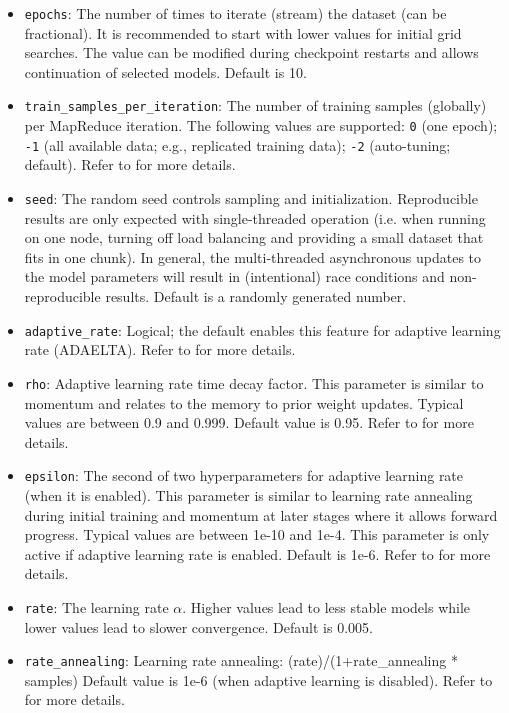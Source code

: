 \documentclass{article}[11pt]
\begin{document}
\begin{itemize}
\item \texttt{epochs}: The number of times to iterate (stream) the dataset (can be fractional). It is recommended to start with lower values for initial grid searches. The value can be modified during checkpoint restarts and allows continuation of selected models. Default is 10.
\item \texttt{train\_samples\_per\_iteration}: The number of training samples (globally) per MapReduce iteration. The following values are supported: \texttt{0} (one epoch); \texttt{-1} (all available data; e.g., replicated training data); \texttt{-2} (auto-tuning; default). Refer to  for more details.
\item \texttt{seed}: The random seed controls sampling and initialization. Reproducible results are only expected with single-threaded operation (i.e. when running on one node, turning off load balancing and providing a small dataset that fits in one chunk).  In general, the multi-threaded asynchronous updates to the model parameters will result in (intentional) race conditions and non-reproducible results.  Default is a randomly generated number.
\item \texttt{adaptive\_rate}: Logical; the default enables this feature for adaptive learning rate (ADAELTA). Refer to   for more details.
\item \texttt{rho}: Adaptive learning rate time decay factor. This parameter is similar to momentum and relates to the memory to prior weight updates. Typical values are between 0.9 and 0.999. Default value is 0.95. Refer to  for more details.
\item \texttt{epsilon}: The second of two hyperparameters for adaptive learning rate (when it is enabled). This parameter is similar to learning rate annealing during initial training and momentum at later stages where it allows forward progress. Typical values are between 1e-10 and 1e-4. This parameter is only active if adaptive learning rate is enabled. Default is 1e-6. Refer to  for more details.
\item \texttt{rate}: The learning rate $\alpha$. Higher values lead to less stable models  while lower values lead to slower convergence. Default is 0.005.
\item \texttt{rate\_annealing}: Learning rate annealing: (rate)/(1+rate\_annealing * samples) Default value is 1e-6 (when adaptive learning is disabled). Refer to  for more details.

\end{itemize}
\end{document}
